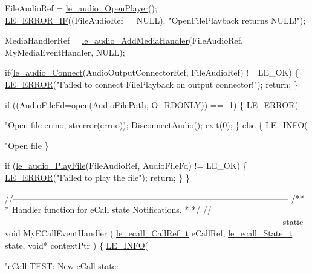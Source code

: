 \begin{DoxyCodeInclude}
{{{{{    FileAudioRef = \hyperlink{le__audio__interface_8h_a92eb1b6377f50ff07b97c5b8546f01ec}{le\_audio\_OpenPlayer}();
    \hyperlink{le__log_8h_aceaf11a11691d6c676e36dd317b38dbd}{LE\_ERROR\_IF}((FileAudioRef==NULL), \textcolor{stringliteral}{"OpenFilePlayback returns NULL!"});

    MediaHandlerRef = \hyperlink{le__audio__interface_8h_a9996ac9d23333cf8219f28b69cac4f81}{le\_audio\_AddMediaHandler}(FileAudioRef,
                                                MyMediaEventHandler,
                                                NULL);

    \textcolor{keywordflow}{if}(\hyperlink{le__audio__interface_8h_a338df65b2fb1ae0140d86880adbcf0de}{le\_audio\_Connect}(AudioOutputConnectorRef, FileAudioRef) != LE\_OK)
    \{
        \hyperlink{le__log_8h_a353590f91b3143a7ba3a416ae5a50c3d}{LE\_ERROR}(\textcolor{stringliteral}{"Failed to connect FilePlayback on output connector!"});
        \textcolor{keywordflow}{return};
    \}

    \textcolor{keywordflow}{if} ((AudioFileFd=open(AudioFilePath, O\_RDONLY)) == -1)
    \{
        \hyperlink{le__log_8h_a353590f91b3143a7ba3a416ae5a50c3d}{LE\_ERROR}(\textcolor{stringliteral}{"Open file %
      \hyperlink{supervisor_8c_a0a4ccfdbe1cf7b37afc60d34e748b066}{errno}, strerror(\hyperlink{supervisor_8c_a0a4ccfdbe1cf7b37afc60d34e748b066}{errno}));
        DisconnectAudio();
        \hyperlink{app_stop_client_8c_a310220604a584e112ba8f7aa3dfe23f1}{exit}(0);
    \}
    \textcolor{keywordflow}{else}
    \{
        \hyperlink{le__log_8h_a23e6d206faa64f612045d688cdde5808}{LE\_INFO}(\textcolor{stringliteral}{"Open file %
    \}

    \textcolor{keywordflow}{if} (\hyperlink{le__audio__interface_8h_aea2c5d0b394cfab87503639c534300c9}{le\_audio\_PlayFile}(FileAudioRef, AudioFileFd) != LE\_OK)
    \{
        \hyperlink{le__log_8h_a353590f91b3143a7ba3a416ae5a50c3d}{LE\_ERROR}(\textcolor{stringliteral}{"Failed to play the file"});
        \textcolor{keywordflow}{return};
    \}
\}

\textcolor{comment}{//--------------------------------------------------------------------------------------------------}\textcolor{comment}{}
\textcolor{comment}{/**}
\textcolor{comment}{ * Handler function for eCall state Notifications.}
\textcolor{comment}{ *}
\textcolor{comment}{ */}
\textcolor{comment}{//--------------------------------------------------------------------------------------------------}
\textcolor{keyword}{static} \textcolor{keywordtype}{void} MyECallEventHandler
(
    \hyperlink{le__ecall__interface_8h_a8536728653b7b3cdd6b298c6e7b67705}{le\_ecall\_CallRef\_t}  eCallRef,
    \hyperlink{le__ecall__interface_8h_a233609e4724e549a1405f9177c0a07dd}{le\_ecall\_State\_t}    state,
    \textcolor{keywordtype}{void}*               contextPtr
)
\{
    \hyperlink{le__log_8h_a23e6d206faa64f612045d688cdde5808}{LE\_INFO}(\textcolor{stringliteral}{"eCall TEST: New eCall state: %

}}}}}}}}
\end{DoxyCodeInclude}
